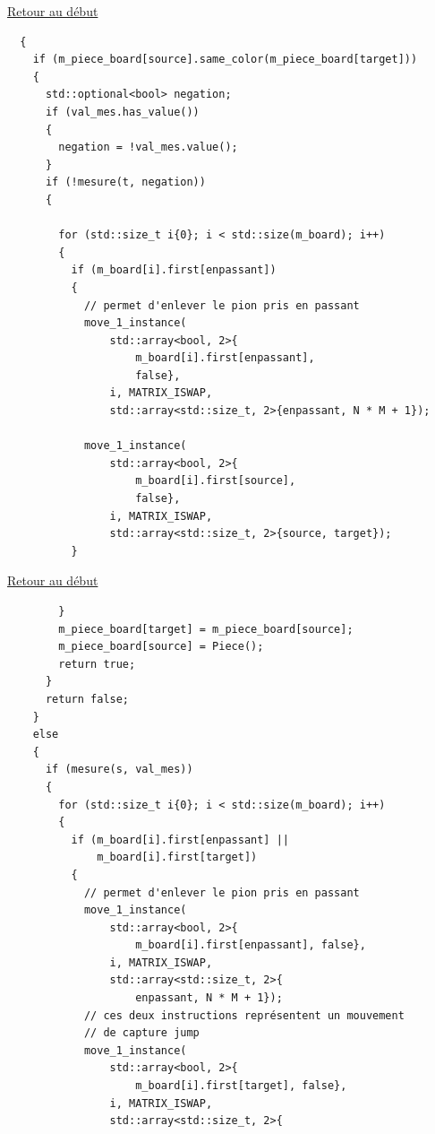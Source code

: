 {\begin{frame}[fragile]
\hyperlink{conclusion}{Retour au début}\newline
\begin{verbatim}
  {
    if (m_piece_board[source].same_color(m_piece_board[target]))
    {
      std::optional<bool> negation;
      if (val_mes.has_value())
      {
        negation = !val_mes.value();
      }
      if (!mesure(t, negation))
      {

        for (std::size_t i{0}; i < std::size(m_board); i++)
        {
          if (m_board[i].first[enpassant])
          {
            // permet d'enlever le pion pris en passant
            move_1_instance(
                std::array<bool, 2>{
                    m_board[i].first[enpassant],
                    false},
                i, MATRIX_ISWAP,
                std::array<std::size_t, 2>{enpassant, N * M + 1});

            move_1_instance(
                std::array<bool, 2>{
                    m_board[i].first[source],
                    false},
                i, MATRIX_ISWAP,
                std::array<std::size_t, 2>{source, target});
          }
\end{verbatim}
\end{frame}

\begin{frame}[fragile]
\hyperlink{conclusion}{Retour au début}\newline
\begin{verbatim}
        }
        m_piece_board[target] = m_piece_board[source];
        m_piece_board[source] = Piece();
        return true;
      }
      return false;
    }
    else
    {
      if (mesure(s, val_mes))
      {
        for (std::size_t i{0}; i < std::size(m_board); i++)
        {
          if (m_board[i].first[enpassant] ||
              m_board[i].first[target])
          {
            // permet d'enlever le pion pris en passant
            move_1_instance(
                std::array<bool, 2>{
                    m_board[i].first[enpassant], false},
                i, MATRIX_ISWAP,
                std::array<std::size_t, 2>{
                    enpassant, N * M + 1});
            // ces deux instructions représentent un mouvement
            // de capture jump
            move_1_instance(
                std::array<bool, 2>{
                    m_board[i].first[target], false},
                i, MATRIX_ISWAP,
                std::array<std::size_t, 2>{
\end{verbatim}
\end{frame}

}
